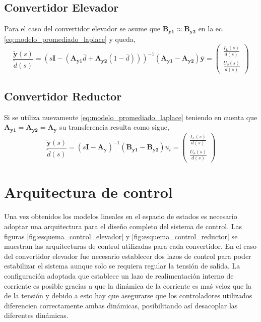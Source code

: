 \subsection{Convertidor Elevador}
Para el caso del convertidor elevador se asume que $\mathbf{B_{y1}} \approx \mathbf{B_{y2}}$ en la ec. \ref{eq:modelo_promediado_laplace} y queda,
\begin{equation}
\frac{\mathbf{\tilde{y}}(s)}{\tilde{d}(s)}=(s\mathbf{I}-(\mathbf{A_{y1}}\bar{d}+\mathbf{A_{y2}}(1-\bar{d})))^{-1}(\mathbf{A_{y1}}-\mathbf{A_{y2}})\mathbf{\bar{y}}=\left(\begin{array}{c}
\frac{I_{L}(s)}{d(s)}\\
\frac{U_{o}(s)}{d(s)}
\end{array}\right)\label{eq:transferencia_elevador}
\end{equation}

\subsection{Convertidor Reductor}
Si se utiliza nuevamente \ref{eq:modelo_promediado_laplace} teniendo en cuenta que $\mathbf{A_{y1}}=\mathbf{A_{y2}}=\mathbf{A_y}$ su transferencia resulta como sigue,
\begin{equation}
\frac{\mathbf{\tilde{y}}(s)}{\tilde{d}(s)}=(s\mathbf{I}-\mathbf{A_{y}})^{-1}(\mathbf{B_{y1}}-\mathbf{B_{y2}})u_{i}=\left(\begin{array}{c}
\frac{I_{L}(s)}{d(s)}\\
\frac{U_{o}(s)}{d(s)}
\end{array}\right)\label{eq:transferencia_reductor}
\end{equation}
\section{Arquitectura de control}
Una vez obtenidos los modelos lineales en el espacio de estados es necesario adoptar una arquitectura para el diseño completo del sistema de control.
Las figuras \ref{fig:esquema_control_elevador} y \ref{fig:esquema_control_reductor} se muestran las arquitecturas de control utilizadas para cada convertidor.
En el caso del convertidor elevador fue necesario establecer dos lazos de control para poder estabilizar el sistema aunque solo se requiera regular la tensión
de salida. La configuración adoptada que establece un lazo de realimentación interno de corriente es posible gracias a que la dinámica
de la corriente es maś veloz que la de la tensión y debido a esto hay que asegurarse que los controladores utilizados diferencien correctamente ambas dinámicas,
posibilitando así desacoplar las diferentes dinámicas.

